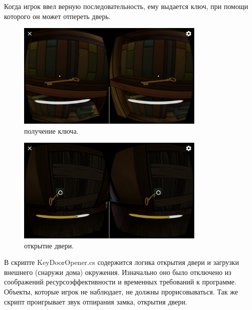 Когда игрок ввел верную последовательность, ему выдается ключ, при помощи которого он может отпереть дверь.


\begin{figure}[h!]
    \centering
    \includegraphics[width=0.8\textwidth]{./screenshots/found_key.jpg}
    \caption{\small{получение ключа.}}
    \label{found_key}
\end{figure} 

\begin{figure}[h!]
    \centering
    \includegraphics[width=0.8\textwidth]{./screenshots/opening_door.jpg}
    \caption{\small{открытие двери.}}
    \label{opening_door}
\end{figure} 

В скрипте KeyDoorOpener.cs содержится логика открытия двери и загрузки внешнего (снаружи дома) окружения. Изначально оно было отключено из соображений ресурсоэффективности и временных требований к программе. Объекты, которые игрок не наблюдает, не должны прорисовываться. Так же скрипт проигрывает звук отпирания замка, открытия двери.

